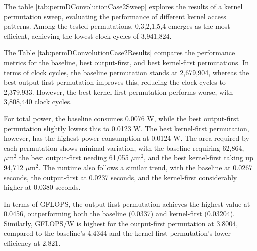 The table \ref{tab:permDConvolutionCase2Sweep} explores the results of a kernel permutation sweep, evaluating the performance of different kernel access patterns. Among the tested permutations, 0,3,2,1,5,4 emerges as the most efficient, achieving the lowest clock cycles of 3,941,824.

\begin{table}[H]
\centering
\caption{Loop permutation results}
\label{tab:permDConvolutionCase2Results}
\end{table}

The Table \ref{tab:permDConvolutionCase2Results} compares the performance metrics for the baseline, best output-first, and best kernel-first permutations. In terms of clock cycles, the baseline permutation stands at 2,679,904, whereas the best output-first permutation improves this, reducing the clock cycles to 2,379,933. However, the best kernel-first permutation performs worse, with 3,808,440 clock cycles.

For total power, the baseline consumes 0.0076 W, while the best output-first permutation slightly lowers this to 0.0123 W. The best kernel-first permutation, however, has the highest power consumption at 0.0124 W. The area required by each permutation shows minimal variation, with the baseline requiring 62,864, $\mu\text{m}^2$ the best output-first needing 61,055 $\mu\text{m}^2$, and the best kernel-first taking up 94,712 $\mu\text{m}^2$. The runtime also follows a similar trend, with the baseline at 0.0267 seconds, the output-first at 0.0237 seconds, and the kernel-first considerably higher at 0.0380 seconds.

In terms of GFLOPS, the output-first permutation achieves the highest value at 0.0456, outperforming both the baseline (0.0337) and kernel-first (0.03204). Similarly, GFLOPS/W is highest for the output-first permutation at 3.8004, compared to the baseline’s 4.4344 and the kernel-first permutation’s lower efficiency at 2.821.

